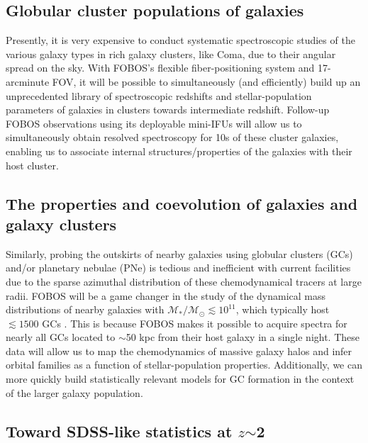 
\subsection{Globular cluster populations of galaxies}

Presently, it is very expensive to conduct systematic spectroscopic
studies of the various galaxy types in rich galaxy clusters, like
Coma, due to their angular spread on the sky. With FOBOS's flexible
fiber-positioning system and 17-arcminute FOV, it will be possible to
simultaneously (and efficiently) build up an unprecedented library of
spectroscopic redshifts and stellar-population parameters of galaxies
in clusters towards intermediate redshift. Follow-up FOBOS
observations using its deployable mini-IFUs will allow us to
simultaneously obtain resolved spectroscopy for 10s of these cluster
galaxies, enabling us to associate internal structures/properties of
the galaxies with their host cluster.

\subsection{The properties and coevolution of galaxies and galaxy clusters}

Similarly, probing the outskirts of nearby galaxies using globular
clusters (GCs) and/or planetary nebulae (PNe) is tedious and
inefficient with current facilities due to the sparse azimuthal
distribution of these chemodynamical tracers at large radii. FOBOS
will be a game changer in the study of the dynamical mass
distributions of nearby galaxies with $\mathcal{M_\ast/M_\odot}
\lesssim 10^{11}$, which typically host $\lesssim1500$ GCs
\citep{2013ApJ...772...82H}. This is because FOBOS makes it possible
to acquire spectra for nearly all GCs located to $\sim$50 kpc from
their host galaxy in a single night. These data will allow us to map
the chemodynamics of massive galaxy halos and infer orbital families
as a function of stellar-population properties. Additionally, we can
more quickly build statistically relevant models for GC formation in
the context of the larger galaxy population.

\subsection{Toward SDSS-like statistics at $z$$\sim$2}
\label{sec:galaxies}




